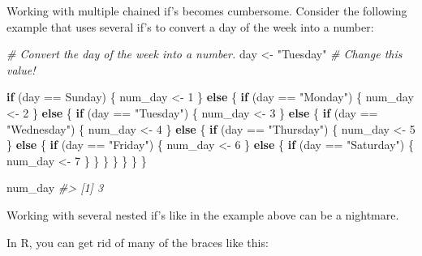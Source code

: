 \documentclass[
]{book}
\newenvironment{Shaded}{\begin{snugshade}}{\end{snugshade}}
\newcommand{\CommentTok}[1]{\textcolor[rgb]{0.56,0.35,0.01}{\textit{#1}}}
\newcommand{\ControlFlowTok}[1]{\textcolor[rgb]{0.13,0.29,0.53}{\textbf{#1}}}
\newcommand{\DecValTok}[1]{\textcolor[rgb]{0.00,0.00,0.81}{#1}}
\newcommand{\NormalTok}[1]{#1}
\newcommand{\OtherTok}[1]{\textcolor[rgb]{0.56,0.35,0.01}{#1}}
\newcommand{\SpecialCharTok}[1]{\textcolor[rgb]{0.00,0.00,0.00}{#1}}
\newcommand{\StringTok}[1]{\textcolor[rgb]{0.31,0.60,0.02}{#1}}
\begin{document}
Working with multiple chained if's becomes cumbersome. Consider the following
example that uses several if's to convert a day of the week into a number:

\begin{Shaded}
\begin{Highlighting}[]
\CommentTok{\# Convert the day of the week into a number.}
\NormalTok{day }\OtherTok{\textless{}{-}} \StringTok{"Tuesday"} \CommentTok{\# Change this value!}

\ControlFlowTok{if}\NormalTok{ (day }\SpecialCharTok{==} \StringTok{\textquotesingle{}Sunday\textquotesingle{}}\NormalTok{) \{}
\NormalTok{  num\_day }\OtherTok{\textless{}{-}} \DecValTok{1}
\NormalTok{\} }\ControlFlowTok{else}\NormalTok{ \{}
  \ControlFlowTok{if}\NormalTok{ (day }\SpecialCharTok{==} \StringTok{"Monday"}\NormalTok{) \{}
\NormalTok{    num\_day }\OtherTok{\textless{}{-}} \DecValTok{2}
\NormalTok{  \} }\ControlFlowTok{else}\NormalTok{ \{}
    \ControlFlowTok{if}\NormalTok{ (day }\SpecialCharTok{==} \StringTok{"Tuesday"}\NormalTok{) \{}
\NormalTok{      num\_day }\OtherTok{\textless{}{-}} \DecValTok{3}
\NormalTok{    \} }\ControlFlowTok{else}\NormalTok{ \{}
      \ControlFlowTok{if}\NormalTok{ (day }\SpecialCharTok{==} \StringTok{"Wednesday"}\NormalTok{) \{}
\NormalTok{        num\_day }\OtherTok{\textless{}{-}} \DecValTok{4}
\NormalTok{      \} }\ControlFlowTok{else}\NormalTok{ \{}
        \ControlFlowTok{if}\NormalTok{ (day }\SpecialCharTok{==} \StringTok{"Thursday"}\NormalTok{) \{}
\NormalTok{          num\_day }\OtherTok{\textless{}{-}} \DecValTok{5}
\NormalTok{        \} }\ControlFlowTok{else}\NormalTok{ \{}
          \ControlFlowTok{if}\NormalTok{ (day }\SpecialCharTok{==} \StringTok{"Friday"}\NormalTok{) \{}
\NormalTok{            num\_day }\OtherTok{\textless{}{-}} \DecValTok{6}
\NormalTok{          \} }\ControlFlowTok{else}\NormalTok{ \{}
            \ControlFlowTok{if}\NormalTok{ (day }\SpecialCharTok{==} \StringTok{"Saturday"}\NormalTok{) \{}
\NormalTok{              num\_day }\OtherTok{\textless{}{-}} \DecValTok{7}
\NormalTok{            \}}
\NormalTok{          \}}
\NormalTok{        \}}
\NormalTok{      \}}
\NormalTok{    \}}
\NormalTok{  \}}
\NormalTok{\}}

\NormalTok{num\_day}
\CommentTok{\#\textgreater{} [1] 3}
\end{Highlighting}
\end{Shaded}

Working with several nested if's like in the example above can be a nightmare.

In R, you can get rid of many of the braces like this:
\end{document}
